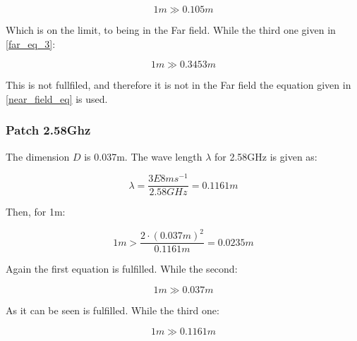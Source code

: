 \begin{equation}
1m \gg 0.105m
\end{equation}

Which is on the limit, to  being in the Far field. While the third one given in \ref{far_eq_3}:

\begin{equation}
1m \gg 0.3453m
\end{equation}

This is not fullfiled, and therefore it is not in the Far field the equation given in \ref{near_field_eq} is used.
\newpage

\subsubsection{Patch 2.58Ghz}

The dimension $D$ is 0.037m. The wave length $\lambda$ for 2.58GHz is given as:

\begin{equation}
\lambda = \frac{3E8 ms^{-1}}{2.58 GHz} = 0.1161m
\end{equation}

Then, for 1m:

\begin{equation}
1m > \frac{2 \cdot (0.037m)^{2}}{0.1161m} = 0.0235m
\end{equation} 

Again the first equation is fulfilled. While the second:

\begin{equation}
1m \gg 0.037m
\end{equation}

As it can be seen is fulfilled. While the third one:

\begin{equation}
1m \gg 0.1161m
\end{equation}



 




